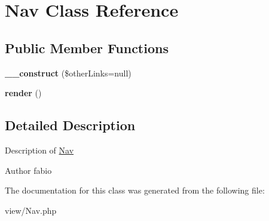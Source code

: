 \hypertarget{classNav}{\section{Nav Class Reference}
\label{classNav}
}
\subsection*{Public Member Functions}
\begin{DoxyCompactItemize}
\item 
\hypertarget{classNav_a7259952c17df9af4f7fef4bfce0c47a3}{{\bfseries \+\_\+\+\_\+construct} (\$other\+Links=null)}\label{classNav_a7259952c17df9af4f7fef4bfce0c47a3}

\item 
\hypertarget{classNav_a3e7c5d2f40a243aa27bcef340cf2ec9d}{{\bfseries render} ()}\label{classNav_a3e7c5d2f40a243aa27bcef340cf2ec9d}

\end{DoxyCompactItemize}


\subsection{Detailed Description}
Description of \hyperlink{classNav}{Nav}

\begin{DoxyAuthor}{Author}
fabio 
\end{DoxyAuthor}


The documentation for this class was generated from the following file\+:\begin{DoxyCompactItemize}
\item 
view/Nav.\+php\end{DoxyCompactItemize}
